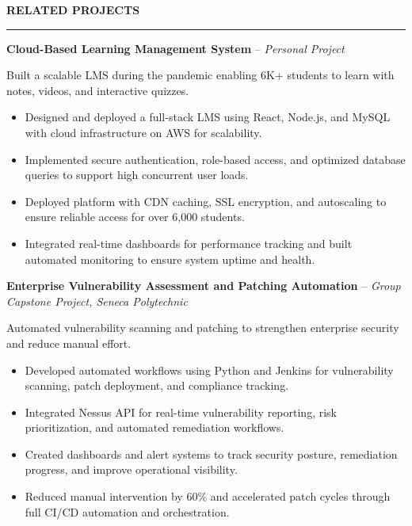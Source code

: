 \documentclass[10pt,letterpaper]{article}
\begin{document}
\vspace{6pt}

\textbf{RELATED PROJECTS}\\[-8pt]
\noindent\rule{\textwidth}{1pt}

\vspace{-2pt}

\textbf{Cloud-Based Learning Management System} -- \emph{Personal Project}

\vspace{-1pt}

Built a scalable LMS during the pandemic enabling 6K+ students to learn with notes, videos, and interactive quizzes.
\vspace{-1pt}
\begin{itemize}
\item Designed and deployed a full-stack LMS using React, Node.js, and MySQL with cloud infrastructure on AWS for scalability.
\item Implemented secure authentication, role-based access, and optimized database queries to support high concurrent user loads.
\item Deployed platform with CDN caching, SSL encryption, and autoscaling to ensure reliable access for over 6,000 students.
\item Integrated real-time dashboards for performance tracking and built automated monitoring to ensure system uptime and health.
\end{itemize}

\textbf{Enterprise Vulnerability Assessment and Patching Automation} -- \emph{Group Capstone Project, Seneca Polytechnic}

\vspace{-1pt}

Automated vulnerability scanning and patching to strengthen enterprise security and reduce manual effort.
\vspace{-1pt}
\begin{itemize}
\item Developed automated workflows using Python and Jenkins for vulnerability scanning, patch deployment, and compliance tracking.
\item Integrated Nessus API for real-time vulnerability reporting, risk prioritization, and automated remediation workflows.
\item Created dashboards and alert systems to track security posture, remediation progress, and improve operational visibility.
\item Reduced manual intervention by 60\% and accelerated patch cycles through full CI/CD automation and orchestration.
\end{itemize}
\end{document}
